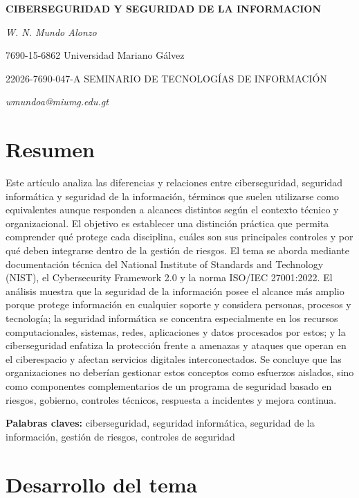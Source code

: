 \documentclass[12pt,letterpaper]{article}
\begin{document}
\justifying

\begin{center}
{\bfseries CIBERSEGURIDAD Y SEGURIDAD DE LA INFORMACION}\par
\vspace{4pt}
{\itshape W. N. Mundo Alonzo}\par
7690-15-6862 Universidad Mariano Gálvez\par
22026-7690-047-A SEMINARIO DE TECNOLOGÍAS DE INFORMACIÓN\par
{\itshape wmundoa@miumg.edu.gt}
\end{center}

\section*{Resumen}
Este artículo analiza las diferencias y relaciones entre ciberseguridad, seguridad informática y seguridad de la información, términos que suelen utilizarse como equivalentes aunque responden a alcances distintos según el contexto técnico y organizacional. El objetivo es establecer una distinción práctica que permita comprender qué protege cada disciplina, cuáles son sus principales controles y por qué deben integrarse dentro de la gestión de riesgos. El tema se aborda mediante documentación técnica del National Institute of Standards and Technology (NIST), el Cybersecurity Framework 2.0 y la norma ISO/IEC 27001:2022. El análisis muestra que la seguridad de la información posee el alcance más amplio porque protege información en cualquier soporte y considera personas, procesos y tecnología; la seguridad informática se concentra especialmente en los recursos computacionales, sistemas, redes, aplicaciones y datos procesados por estos; y la ciberseguridad enfatiza la protección frente a amenazas y ataques que operan en el ciberespacio y afectan servicios digitales interconectados. Se concluye que las organizaciones no deberían gestionar estos conceptos como esfuerzos aislados, sino como componentes complementarios de un programa de seguridad basado en riesgos, gobierno, controles técnicos, respuesta a incidentes y mejora continua.

\textbf{Palabras claves:} ciberseguridad, seguridad informática, seguridad de la información, gestión de riesgos, controles de seguridad

\section*{Desarrollo del tema}
\end{document}
